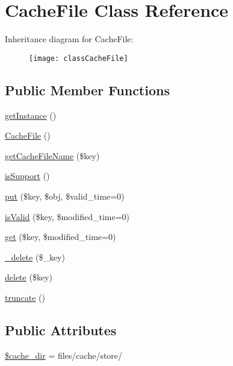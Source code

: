 \hypertarget{classCacheFile}{}\section{Cache\+File Class Reference}
\label{classCacheFile}
Inheritance diagram for Cache\+File\+:\begin{figure}[H]
\begin{center}
\leavevmode
\texttt{[image: classCacheFile]}
\end{center}
\end{figure}
\subsection*{Public Member Functions}
\begin{DoxyCompactItemize}
\item 
\hyperlink{classCacheFile_a5389ea809c31aed387c12eb37b2677b8}{get\+Instance} ()
\item 
\hyperlink{classCacheFile_a989f8b586fb83812f1c0ab1e3f2e302a}{Cache\+File} ()
\item 
\hyperlink{classCacheFile_a15ca23dea98604dc2e6d067f9ce48242}{get\+Cache\+File\+Name} (\$key)
\item 
\hyperlink{classCacheFile_ab3982221be8af4a74302b648831d1376}{is\+Support} ()
\item 
\hyperlink{classCacheFile_a1883472236dececa9215546dae2733cc}{put} (\$key, \$obj, \$valid\+\_\+time=0)
\item 
\hyperlink{classCacheFile_ab154224d403ed4199885414cfa34d713}{is\+Valid} (\$key, \$modified\+\_\+time=0)
\item 
\hyperlink{classCacheFile_aa5834aeb4fce61fe5e99d06fe3795d84}{get} (\$key, \$modified\+\_\+time=0)
\item 
\hyperlink{classCacheFile_a59058fb815de83e25ec107fec5dff2d2}{\+\_\+delete} (\$\+\_\+key)
\item 
\hyperlink{classCacheFile_aae765f3dbe6d888b5e272c247f696518}{delete} (\$key)
\item 
\hyperlink{classCacheFile_a990fc76da2501ced9077aff881350f7f}{truncate} ()
\end{DoxyCompactItemize}
\subsection*{Public Attributes}
\begin{DoxyCompactItemize}
\item 
\hyperlink{classCacheFile_a39d0574a28dd55f6b312811f411f2f51}{\$cache\+\_\+dir} = \textquotesingle{}files/cache/store/\textquotesingle{}
\end{DoxyCompactItemize}


